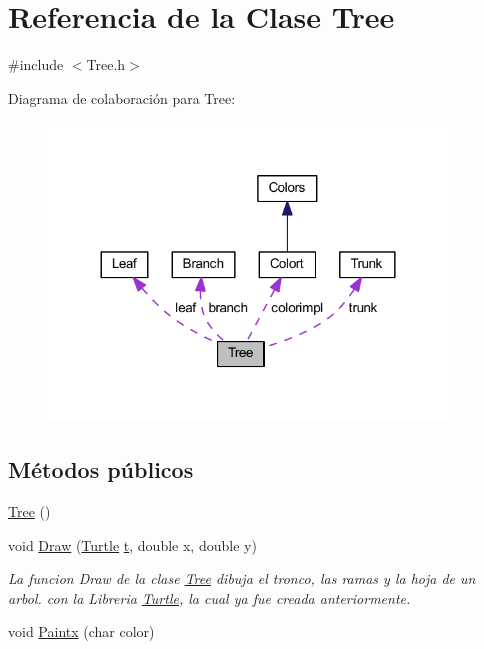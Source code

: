 \hypertarget{class_tree}{}\section{Referencia de la Clase Tree}
\label{class_tree}


{\ttfamily \#include $<$Tree.\+h$>$}



Diagrama de colaboración para Tree\+:
\nopagebreak
\begin{figure}[H]
\begin{center}
\leavevmode
\includegraphics[width=300pt]{class_tree__coll__graph}
\end{center}
\end{figure}
\subsection*{Métodos públicos}
\begin{DoxyCompactItemize}
\item 
\mbox{\hyperlink{class_tree_ad376a7c639d857312f5de2ef47482f68}{Tree}} ()
\item 
void \mbox{\hyperlink{class_tree_a76dc7e174c3c98b7e3b3839cdafa8a92}{Draw}} (\mbox{\hyperlink{class_turtle}{Turtle}} \mbox{\hyperlink{_abstract_8cpp_a87833ae07d42f160626b6355cd9f8cf0}{t}}, double x, double y)
\begin{DoxyCompactList}\small\item\em La funcion Draw de la clase \mbox{\hyperlink{class_tree}{Tree}} dibuja el tronco, las ramas y la hoja de un arbol. con la Libreria \mbox{\hyperlink{class_turtle}{Turtle}}, la cual ya fue creada anteriormente. \end{DoxyCompactList}\item 
void \mbox{\hyperlink{class_tree_a63989c4c8644b423c54923a77a502020}{Paintx}} (char color)
\end{DoxyCompactItemize}
